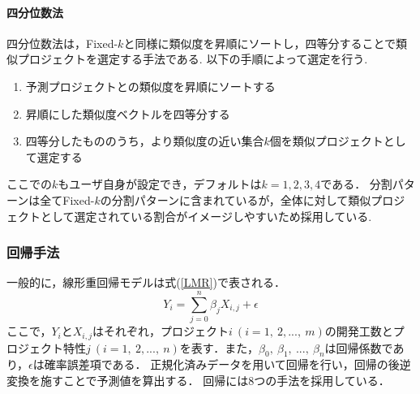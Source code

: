 \paragraph{四分位数法 \quad \\}
四分位数法は，Fixed-$k$と同様に類似度を昇順にソートし，四等分することで類似プロジェクトを選定する手法である.
以下の手順によって選定を行う.
\begin{enumerate}[label=(\arabic*)]
  \item 予測プロジェクトとの類似度を昇順にソートする
  \item 昇順にした類似度ベクトルを四等分する
  \item 四等分したもののうち，より類似度の近い集合$k$個を類似プロジェクトとして選定する
\end{enumerate}
ここでの$k$もユーザ自身が設定でき，デフォルトは$k=1,2,3,4$である．
分割パターンは全てFixed-$k$の分割パターンに含まれているが，全体に対して類似プロジェクトとして選定されている割合がイメージしやすいため採用している.
\subsubsection{回帰手法}\label{Regression}
一般的に，線形重回帰モデルは式(\ref{LMR})で表される．
\begin{equation}
  \label{LMR}
  Y_{i} = \sum_{j=0}^{n}{\beta_{j}X_{i,j}+\epsilon}
\end{equation}
ここで，$Y_{i}$と$X_{i,j}$はそれぞれ，プロジェクト$i~(i=1,~2,...,~m)$の開発工数とプロジェクト特性$j~(i=1,~2,...,~n)$を表す．また，$\beta_0,~\beta_1,~...,~\beta_n$は回帰係数であり，$\epsilon$は確率誤差項である．
正規化済みデータを用いて回帰を行い，回帰の後逆変換を施すことで予測値を算出する．
回帰には8つの手法を採用している．


